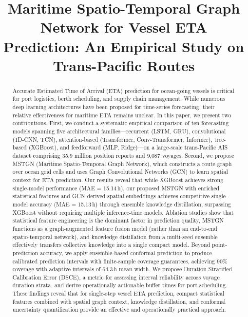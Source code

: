 \documentclass[conference]{IEEEtran}
\title{Maritime Spatio-Temporal Graph Network for Vessel ETA Prediction: An Empirical Study on Trans-Pacific Routes}
\author{
\IEEEauthorblockN{Anonymous}
\IEEEauthorblockA{Anonymous Affiliation}
}
\begin{document}
\maketitle

\begin{abstract}
Accurate Estimated Time of Arrival (ETA) prediction for ocean-going vessels is critical for port logistics, berth scheduling, and supply chain management.
While numerous deep learning architectures have been proposed for time-series forecasting, their relative effectiveness for maritime ETA remains unclear.
In this paper, we present two contributions.
First, we conduct a systematic empirical comparison of ten forecasting models spanning five architectural families---recurrent (LSTM, GRU), convolutional (1D-CNN, TCN), attention-based (Transformer, Conv-Transformer, Informer), tree-based (XGBoost), and feedforward (MLP, Ridge)---on a large-scale trans-Pacific AIS dataset comprising 35.9 million position reports and 9,087 voyages.
Second, we propose MSTGN (Maritime Spatio-Temporal Graph Network), which constructs a route graph over ocean grid cells and uses Graph Convolutional Networks (GCN) to learn spatial context for ETA prediction.
Our results reveal that while XGBoost achieves strong single-model performance (MAE = 15.14\,h), our proposed MSTGN with enriched statistical features and GCN-derived spatial embeddings achieves competitive single-model accuracy (MAE = 15.13\,h) through ensemble knowledge distillation, surpassing XGBoost without requiring multiple inference-time models.
Ablation studies show that statistical feature engineering is the dominant factor in prediction quality, MSTGN functions as a graph-augmented feature fusion model (rather than an end-to-end spatio-temporal network), and knowledge distillation from a multi-seed ensemble effectively transfers collective knowledge into a single compact model.
Beyond point-prediction accuracy, we apply ensemble-based conformal prediction to produce calibrated prediction intervals with finite-sample coverage guarantees, achieving 90\% coverage with adaptive intervals of 64.3\,h mean width.
We propose Duration-Stratified Calibration Error (DSCE), a metric for assessing interval reliability across voyage duration strata, and derive operationally actionable buffer times for port scheduling.
These findings reveal that for single-step vessel ETA prediction, compact statistical features combined with spatial graph context, knowledge distillation, and conformal uncertainty quantification provide an effective and operationally practical approach.
\end{abstract}
\end{document}
